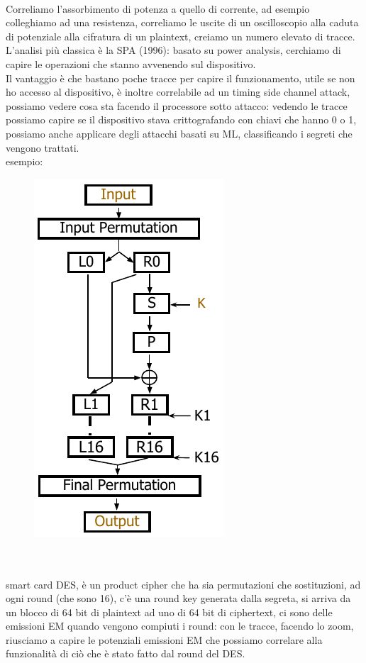 \documentclass[oneside, 12pt]{extbook}
\begin{document}
\\Correliamo l'assorbimento di potenza a quello di corrente, ad esempio colleghiamo ad una resistenza, correliamo le uscite di un oscilloscopio alla caduta di potenziale alla cifratura di un plaintext, creiamo un numero elevato di tracce.
\\L'analisi più classica è la SPA (1996): basato su power analysis, cerchiamo di capire le operazioni che stanno avvenendo sul dispositivo.
\\Il vantaggio è che bastano poche tracce per capire il funzionamento, utile se non ho accesso al dispositivo, è inoltre correlabile ad un timing side channel attack, possiamo vedere cosa sta facendo il processore sotto attacco: vedendo le tracce possiamo capire se il dispositivo stava crittografando con chiavi che hanno 0 o 1, possiamo anche applicare degli attacchi basati su ML, classificando i segreti che vengono trattati.
\\esempio:
\begin{figure}[!h]
	\includegraphics[scale=0.6]{immagini/hardware/smart_card_des.png}
\end{figure}
\\\\smart card DES, è un product cipher che ha sia permutazioni che sostituzioni, ad ogni round (che sono 16), c'è una round key generata dalla segreta, si arriva da un blocco di 64 bit di plaintext ad uno di 64 bit di ciphertext, ci sono delle emissioni EM quando vengono compiuti i round: con le tracce, facendo lo zoom, riusciamo a capire le potenziali emissioni EM che possiamo correlare alla funzionalità di ciò che è stato fatto dal round del DES.
\end{document}
